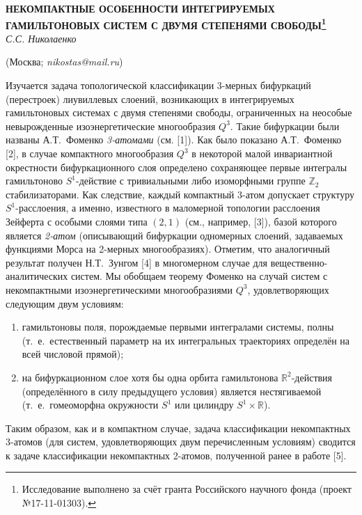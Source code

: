 \begin{center}
    {\bf НЕКОМПАКТНЫЕ ОСОБЕННОСТИ ИНТЕГРИРУЕМЫХ ГАМИЛЬТОНОВЫХ СИСТЕМ С ДВУМЯ СТЕПЕНЯМИ СВОБОДЫ\footnote{Исследование выполнено за счёт гранта Российского научного фонда (проект №17-11-01303).}}\\

    {\it С.С. Николаенко}

    (Москва; {\it nikostas@mail.ru})
\end{center}


Изучается задача топологической классификации 3-мер\-ных бифуркаций (перестроек) лиувиллевых слоений, возникающих в интегрируемых гамильтоновых системах с двумя степенями свободы, ограниченных на неособые невырожденные изоэнергетические многообразия $Q^3$. Такие бифуркации были названы А.Т.~Фоменко {\it 3-атомами} (см. [1]). Как было показано А.Т.~Фоменко [2], в случае компактного многообразия $Q^3$ в некоторой малой инвариантной окрестности бифуркационного слоя определено сохраняющее первые интегралы гамильтоново $S^1$-действие с тривиальными либо изоморфными группе $\mathbb Z_2$ стабилизаторами. Как следствие, каждый компактный 3-атом допускает структуру $S^1$-расслоения, а именно, известного в маломерной топологии расслоения Зейферта с особыми слоями типа $(2,1)$ (см., например, [3]), базой которого является {\it 2-атом} (описывающий бифуркации одномерных слоений, задаваемых функциями Морса на 2-мерных многообразиях). Отметим, что аналогичный результат получен Н.Т.~Зунгом [4] в многомерном случае для вещественно-аналитических систем. Мы обобщаем теорему Фоменко на случай систем с некомпактными изоэнергетическими многообразиями $Q^3$, удовлетворяющих следующим двум условиям:
\begin{enumerate}
	\item гамильтоновы поля, порождаемые первыми интегралами системы, полны (т.~е.~естественный параметр на их интегральных траекториях определён на всей числовой прямой);
	\item на бифуркационном слое хотя бы одна орбита гамильтонова $\mathbb R^2$-действия (определённого в силу предыдущего условия) является нестягиваемой (т.~е.~гомеоморфна окружности $S^1$ или цилиндру $S^1\times\mathbb R$).
\end{enumerate}
Таким образом, как и в компактном случае, задача классификации некомпактных 3-атомов (для систем, удовлетворяющих двум перечисленным условиям) сводится к задаче классификации некомпактных 2-атомов, полученной ранее в работе [5].



